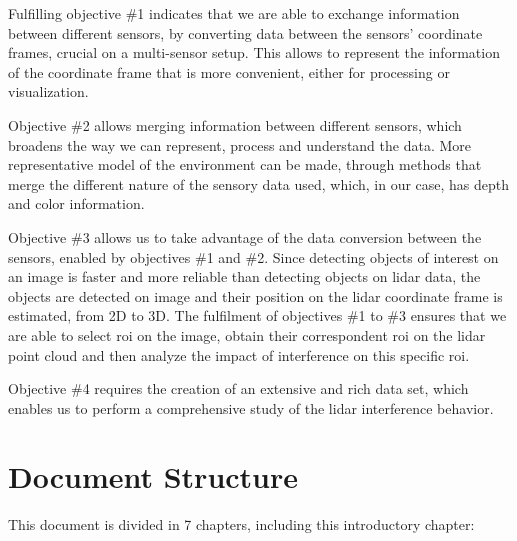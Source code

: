 Fulfilling objective \#1 indicates that we are able to exchange information between different sensors, by converting data between the sensors' coordinate frames, crucial on a multi-sensor setup. This allows to represent the information of the coordinate frame that is more convenient, either for processing or visualization. 

Objective \#2 allows merging information between different sensors, which broadens the way we can represent, process and understand the data. More representative model of the environment can be made, through methods that merge the different nature of the sensory data used, which, in our case, has depth and color information. 

Objective \#3 allows us to take advantage of the data conversion between the sensors, enabled by objectives \#1 and \#2. Since detecting objects of interest on an image is faster and more reliable than detecting objects on \ac{lidar} data, the objects are detected on image and their position on the \ac{lidar} coordinate frame is estimated, from 2D to 3D. The fulfilment of objectives \#1 to \#3 ensures that we are able to select \acf{roi} on the image, obtain their correspondent \ac{roi} on the \ac{lidar} point cloud and then analyze the impact of interference on this specific \ac{roi}.

Objective \#4 requires the creation of an extensive and rich data set, which enables us to perform a comprehensive study of the \ac{lidar} interference behavior.

\section{Document Structure}
\label{sec:introduction:structure}
This document is divided in 7 chapters, including this introductory chapter:

